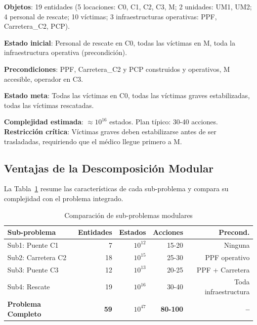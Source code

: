 \documentclass[conference]{IEEEtran}
\begin{document}
    \textbf{Objetos}: 19 entidades (5 locaciones: C0, C1, C2, C3, M; 2 unidades: UM1, UM2; 4 personal de rescate; 10 víctimas; 3 infraestructuras operativas: PPF, Carretera\_C2, PCP).

    \textbf{Estado inicial}: Personal de rescate en C0, todas las víctimas en M, toda la infraestructura operativa (precondición).

    \textbf{Precondiciones}: PPF, Carretera\_C2 y PCP construidos y operativos, M accesible, operador en C3.

    \textbf{Estado meta}: Todas las víctimas en C0, todas las víctimas graves estabilizadas, todas las víctimas rescatadas.

    \textbf{Complejidad estimada}: $\approx 10^{16}$ estados. Plan típico: 30-40 acciones. \textbf{Restricción crítica}: Víctimas graves deben estabilizarse antes de ser trasladadas, requiriendo que el médico llegue primero a M.

    \subsection{Ventajas de la Descomposición Modular}

    La Tabla~\ref{tab:subproblemas} resume las características de cada sub-problema y compara su complejidad con el problema integrado.

    \begin{table}[htbp]
    \caption{Comparación de sub-problemas modulares}
    \label{tab:subproblemas}
    \centering
    \scriptsize
    \begin{tabular}{@{}lrrrr@{}}
    \toprule
    \textbf{Sub-problema} & \textbf{Entidades} & \textbf{Estados} & \textbf{Acciones} & \textbf{Precond.} \\
    \midrule
    Sub1: Puente C1 & 7 & $10^{12}$ & 15-20 & Ninguna \\
    Sub2: Carretera C2 & 18 & $10^{15}$ & 25-30 & PPF operativo \\
    Sub3: Puente C3 & 12 & $10^{13}$ & 20-25 & PPF + Carretera \\
    Sub4: Rescate & 19 & $10^{16}$ & 30-40 & Toda infraestructura \\
    \midrule
    \textbf{Problema Completo} & \textbf{59} & \textbf{$10^{47}$} & \textbf{80-100} & \textbf{--} \\
    \bottomrule
    \end{tabular}
    \end{table}
\end{document}

